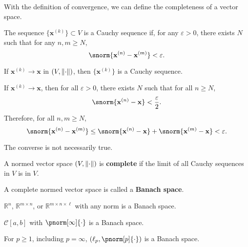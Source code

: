\documentclass{huhtakm-template-book-v2}
\begin{document}
    With the definition of convergence, we can define the completeness of a vector space.
    \begin{defn}
        The sequence $\{\mathbf{x}^{(k)}\} \subset V$ is a Cauchy sequence if, for any $\varepsilon > 0$, there exists $N$ such that for any $n, m \geq N$, 
        \begin{equation*}
            \snorm{\mathbf{x}^{(n)} - \mathbf{x}^{(m)}} < \varepsilon.
        \end{equation*}
    \end{defn}
    \begin{thm}
        If $\mathbf{x}^{(k)} \to \mathbf{x}$ in $(V, \lVert{\cdot}\rVert)$, then $\{\mathbf{x}^{(k)}\}$ is a Cauchy sequence.
    \end{thm}
    \begin{proofing}
        If $\mathbf{x}^{(k)} \to \mathbf{x}$, then for all $\varepsilon > 0$, there exists $N$ such that for all $n \geq N$,
        \begin{equation*}
            \snorm{\mathbf{x}^{(n)} - \mathbf{x}} < \frac{\varepsilon}{2}.
        \end{equation*}
        Therefore, for all $n, m \geq N$,
        \begin{equation*}
            \snorm{\mathbf{x}^{(n)} - \mathbf{x}^{(m)}} \leq \snorm{\mathbf{x}^{(n)} - \mathbf{x}} + \snorm{\mathbf{x}^{(m)} - \mathbf{x}} < \varepsilon.
        \end{equation*}
    \end{proofing}
    \begin{rem}
        The converse is not necessarily true.
    \end{rem}
    \begin{defn}
        A normed vector space $(V, \lVert{\cdot}\rVert)$ is \textbf{complete} if the limit of all Cauchy sequences in $V$ is in $V$.
    \end{defn}
    \begin{defn}
        A complete normed vector space is called a \textbf{Banach space}.
    \end{defn}
    \begin{eg}
        $\mathbb{R}^{n}$, $\mathbb{R}^{m \times n}$, or $\mathbb{R}^{m \times n \times \ell}$ with any norm is a Banach space.
    \end{eg}
    \begin{eg}
        $\mathcal{C}[a, b]$ with $\pnorm[\infty]{\cdot}$ is a Banach space.
    \end{eg}
    \begin{eg}
        For $p \geq 1$, including $p = \infty$, $(\ell_{p}, \pnorm[p]{\cdot})$ is a Banach space.
    \end{eg}
\end{document}
